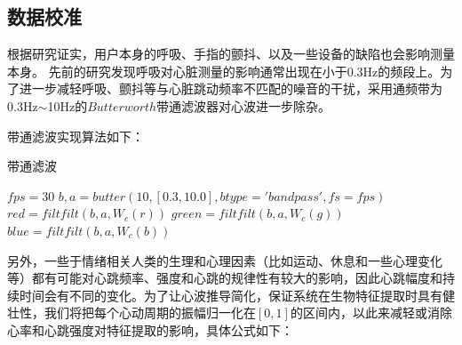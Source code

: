 \subsection{数据校准}
{
根据研究证实，用户本身的呼吸、手指的颤抖、以及一些设备的缺陷也会影响测量本身。
先前的研究发现呼吸对心脏测量的影响通常出现在小于0.3Hz的频段上\cite{Chon2014Respiratory}。为了进一步减轻呼吸、颤抖等与心脏跳动频率不匹配的噪音的干扰，采用通频带为 0.3Hz$\sim$10Hz的$Butterworth$带通滤波器\cite{1975Theory}对心波进一步除杂。
}
\par
{带通滤波实现算法如下：}
\begin{algorithm}
        \caption{带通滤波}
        \begin{algorithmic}[1] %
        \State $fps=30$ \hspace{12em}{\#设置采用频率}
         \hspace{8em}\space{}
            \State $b, a = butter(10, [0.3,10.0], btype='bandpass', fs=fps)$
            \State $red = filtfilt(b, a, W_c(r))$\hspace{3em}\space{}
            \State $green = filtfilt(b, a, W_c(g))$
            \State $blue = filtfilt(b, a, W_c(b))$
        \EndFunction
        \end{algorithmic}
    \end{algorithm}
\par
{另外，一些于情绪相关人类的生理和心理因素（比如运动、休息和一些心理变化等）都有可能对心跳频率、强度和心跳的规律性有较大的影响，因此心跳幅度和持续时间会有不同的变化。为了让心波推导简化，保证系统在生物特征提取时具有健壮性，我们将把每个心动周期的振幅归一化在$[0,1]$的区间内，以此来减轻或消除心率和心跳强度对特征提取的影响，具体公式如下：

}


